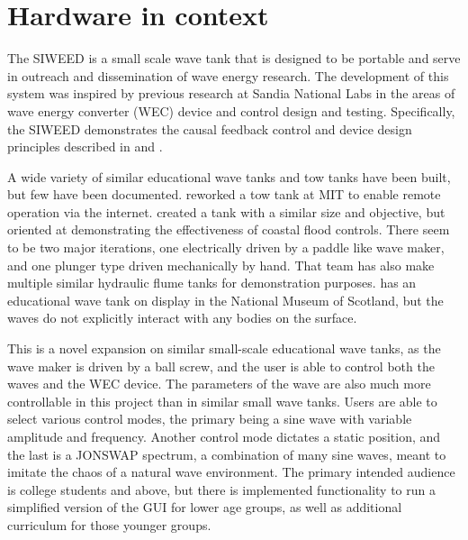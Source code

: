 \documentclass[11pt, letterpaper]{article}
\begin{document}
\section{Hardware in context} %
The SIWEED is a small scale wave tank that is designed to be portable and serve in outreach and dissemination of wave energy research.
The development of this system was inspired by previous research at Sandia National Labs in the areas of wave energy converter (WEC) device and control design and testing.
Specifically, the SIWEED demonstrates the causal feedback control and device design principles described in \citet{Bacelli2020} and \citet{Coe2020a}.


A wide variety of similar educational wave tanks and tow tanks have been built, but few have been documented.
\citet{unger2006creating} reworked a tow tank at MIT to enable remote operation via the internet.
\citet{Trust2015} created a tank with a similar size and objective, but oriented at demonstrating the effectiveness of coastal flood controls.
There seem to be two major iterations, one electrically driven by a paddle like wave maker, and one plunger type driven mechanically by hand. 
That team has also make multiple similar hydraulic flume tanks for demonstration purposes.
\citet{Ivan2016} has an educational wave tank on display in the National Museum of Scotland, but the waves do not explicitly interact with any bodies on the surface. 

This is a novel expansion on similar small-scale educational wave tanks, as the wave maker is driven by a ball screw, and the user is able to control both the waves and the WEC device.
The parameters of the wave are also much more controllable in this project than in similar small wave tanks.
Users are able to select various control modes, the primary being a sine wave with variable amplitude and frequency.
Another control mode dictates a static position, and the last is a JONSWAP spectrum, a combination of many sine waves, meant to imitate the chaos of a natural wave environment.
The primary intended audience is college students and above, but there is implemented functionality to run a simplified version of the GUI for lower age groups, as well as additional curriculum for those younger groups.
\end{document}
